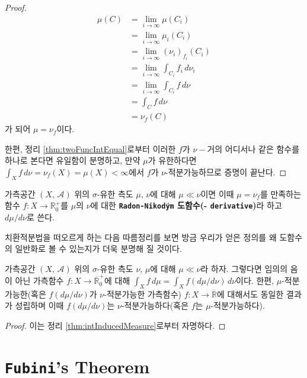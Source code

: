 \begin{proof}
    \begin{align*}
        \mu(C)&=\lim_{i\to\infty}\mu(C_i)\\
        &=\lim_{i\to\infty}\mu_i(C_i)\\
        &=\lim_{i\to\infty}(\nu_i)_{f_i}(C_i)\\
        &=\lim_{i\to\infty}\int_{C_i}f_i\,d\nu_i\\
        &=\lim_{i\to\infty}\int_{C_i}f\,d\nu\\
        &=\int_Cf\,d\nu\\
        &=\nu_f(C)
    \end{align*}
    가 되어 $\mu=\nu_f$이다.

    한편, 정리 \ref{thm:twoFuncIntEqual}로부터 이러한 $f$가 $\nu-$거의 어디서나 같은 함수를 하나로 본다면 유일함이 분명하고, 만약 $\mu$가 유한하다면 $\int_Xf\,d\nu=\nu_f(X)=\mu(X)<\infty$에서 $f$가 $\nu$-적분가능하므로 증명이 끝난다.
\end{proof}

\begin{definition}\label{def:radonNikodym}
    가측공간 $(X,\,\mathcal{A})$ 위의 $\sigma$-유한 측도 $\mu,\,\nu$에 대해 $\mu\ll\nu$이면 이때 $\mu=\nu_f$를 만족하는 함수 $f:X\to\mathbb{R}^+_0$를 $\mu$의 $\nu$에 대한 \textbf{\texttt{Radon-Nikod\'ym} 도함수(- \texttt{derivative})}라 하고 $d\mu/d\nu$로 쓴다.
\end{definition}

치환적분법을 떠오르게 하는 다음 따름정리를 보면 방금 우리가 얻은 정의를 왜 도함수의 일반화로 볼 수 있는지가 더욱 분명해 질 것이다.

\begin{corollary}\label{cor:radonNikodym}
    가측공간 $(X,\,\mathcal{A})$ 위의 $\sigma$-유한 측도 $\nu,\,\mu$에 대해 $\mu\ll\nu$라 하자. 그렇다면 임의의 음이 아닌 가측함수 $f:X\to\overline{\mathbb{R}}^+_0$에 대해 $\int_Xf\,d\mu=\int_Xf(d\mu/d\nu)\,d\nu$이다. 한편, $\mu$-적분가능한(혹은 $f(d\mu/d\nu)$가 $\nu$-적분가능한 가측함수) $f:X\to\overline{\mathbb{R}}$에 대해서도 동일한 결과가 성립하며 이때 $f(d\mu/d\nu)$는 $\nu$-적분가능하다(혹은 $f$는 $\mu$-적분가능하다).
\end{corollary}

\begin{proof}
    이는 정리 \ref{thm:intInducedMeasure}로부터 자명하다.
\end{proof}

\section{\texttt{Fubini}'s Theorem}

